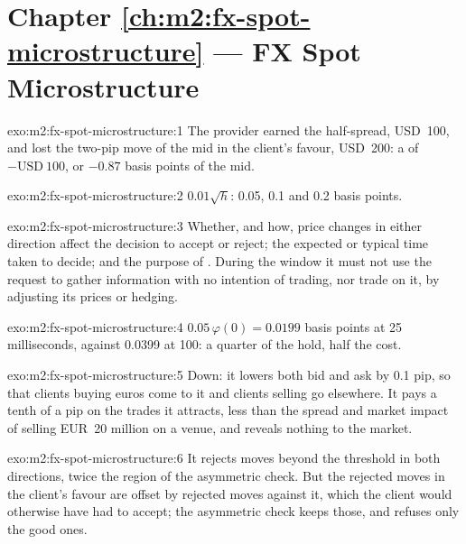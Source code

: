 \section*{Chapter \ref{ch:m2:fx-spot-microstructure} --- FX Spot Microstructure}

\begin{solution}{exo:m2:fx-spot-microstructure:1}
The provider earned the half-spread, USD~100, and lost the two-pip move of the
mid in the client's favour, USD~200: a  of $-\text{USD}~100$, or $-0.87$
basis points of the mid.
\end{solution}

\begin{solution}{exo:m2:fx-spot-microstructure:2}
$0.01\sqrt{h}$: 0.05, 0.1 and 0.2 basis points.
\end{solution}

\begin{solution}{exo:m2:fx-spot-microstructure:3}
Whether, and how, price changes in either direction affect the decision to
accept or reject; the expected or typical time taken to decide; and the purpose
of . During the window it must not use the request to gather
information with no intention of trading, nor trade on it, by adjusting its
prices or hedging.
\end{solution}

\begin{solution}{exo:m2:fx-spot-microstructure:4}
$0.05\,\varphi(0) = 0.0199$ basis points at 25 milliseconds, against 0.0399 at
100: a quarter of the hold, half the cost.
\end{solution}

\begin{solution}{exo:m2:fx-spot-microstructure:5}
Down: it lowers both bid and ask by 0.1 pip, so that clients buying euros come
to it and clients selling go elsewhere. It pays a tenth of a pip on the trades it
attracts, less than the spread and market impact of selling EUR~20 million on a
venue, and reveals nothing to the market.
\end{solution}

\begin{solution}{exo:m2:fx-spot-microstructure:6}
It rejects moves beyond the threshold in both directions, twice the region of
the asymmetric check. But the rejected moves in the client's favour are offset
by rejected moves against it, which the client would otherwise have had to
accept; the asymmetric check keeps those, and refuses only the good ones.
\end{solution}

